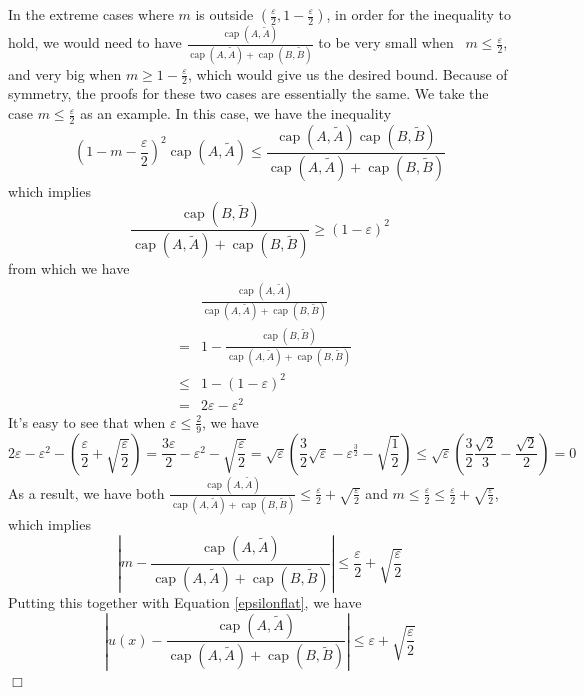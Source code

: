 \documentclass[english, aip, jcp, priprint, graphicx,floatfix]{revtex4-1}
\newcommand{\tmop}[1]{\ensuremath{\operatorname{#1}}}
\theoremstyle{plain}
\theoremstyle{definition}
\theoremstyle{plain}
\begin{document}
In the extreme cases where $m$ is outside $\left( \frac{\varepsilon}{2}, 1 - \frac{\varepsilon}{2} \right)$, in order for the inequality to hold, we would need to have $\frac{\tmop{cap} (A, \tilde{A})}{\tmop{cap} (A, \tilde{A}) + \tmop{cap} (B, \tilde{B})}$ to be very small when \ $m \leqslant \frac{\varepsilon}{2}$, and very big when $m \geqslant 1 - \frac{\varepsilon}{2}$, which would give us the desired bound. Because of symmetry, the proofs for these two cases are essentially the same. We take the case $m \leqslant \frac{\varepsilon}{2}$ as an example. In this case, we have the inequality
\[ \left( 1 - m - \frac{\varepsilon}{2} \right)^2 \tmop{cap} (A, \tilde{A})
\leqslant \frac{\tmop{cap} (A, \tilde{A}) \tmop{cap} (B,
\tilde{B})}{\tmop{cap} (A, \tilde{A}) + \tmop{cap} (B, \tilde{B})} \]
which implies
\[ \frac{\tmop{cap} (B, \tilde{B})}{\tmop{cap} (A, \tilde{A}) + \tmop{cap} (B,
\tilde{B})} \geqslant (1 - \varepsilon)^2 \]
from which we have
\begin{eqnarray*}
&  & \frac{\tmop{cap} (A, \tilde{A})}{\tmop{cap} (A, \tilde{A}) +
\tmop{cap} (B, \tilde{B})}\\
& = & 1 - \frac{\tmop{cap} (B, \tilde{B})}{\tmop{cap} (A, \tilde{A}) +
\tmop{cap} (B, \tilde{B})}\\
& \leqslant & 1 - (1 - \varepsilon)^2\\
& = & 2 \varepsilon - \varepsilon^2
\end{eqnarray*}
It's easy to see that when $\varepsilon \leqslant \frac{2}{9}$, we have
\[ 2 \varepsilon - \varepsilon^2 - \left( \frac{\varepsilon}{2} +
\sqrt{\frac{\varepsilon}{2}} \right) = \frac{3 \varepsilon}{2} -
\varepsilon^2 - \sqrt{\frac{\varepsilon}{2}} = \sqrt{\varepsilon} \left(
\frac{3}{2} \sqrt{\varepsilon} - \varepsilon^{\frac{3}{2}} -
\sqrt{\frac{1}{2}} \right) \leqslant \sqrt{\varepsilon} \left( \frac{3}{2}
\frac{\sqrt{2}}{3} - \frac{\sqrt{2}}{2} \right) = 0 \]
As a result, we have both $\frac{\tmop{cap} (A, \tilde{A})}{\tmop{cap} (A, \tilde{A}) + \tmop{cap} (B, \tilde{B})} \leqslant \frac{\varepsilon}{2} + \sqrt{\frac{\varepsilon}{2}}$ and $m \leqslant \frac{\varepsilon}{2} \leqslant \frac{\varepsilon}{2} + \sqrt{\frac{\varepsilon}{2}}$, which implies
\[ \left| m - \frac{\tmop{cap} (A, \tilde{A})}{\tmop{cap} (A, \tilde{A}) +
\tmop{cap} (B, \tilde{B})} \right| \leqslant \frac{\varepsilon}{2} +
\sqrt{\frac{\varepsilon}{2}} \]
Putting this together with Equation \ref{epsilonflat}, we have
\[ \left| u (x) - \frac{\tmop{cap} (A, \tilde{A})}{\tmop{cap} (A, \tilde{A}) +
\tmop{cap} (B, \tilde{B})} \right| \leqslant \varepsilon +
\sqrt{\frac{\varepsilon}{2}} \]
\hspace*{\fill}$\Box$\medskip
\end{document}
